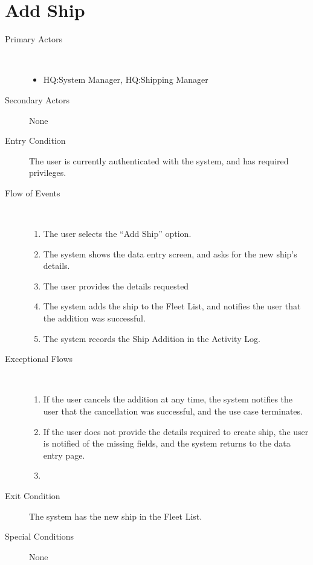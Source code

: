 \documentclass[a4paper,10pt]{report}
\begin{document}
\section{Add Ship}
\begin{description}
\item[Primary Actors] \
  \begin{itemize}
  \item HQ:System Manager, HQ:Shipping Manager
  \end{itemize}
\item[Secondary Actors] None
\item[Entry Condition]
  The user is currently authenticated with the system, and has required privileges.
\item[Flow of Events] \
  \begin{enumerate}
  \item The user selects the ``Add Ship'' option.
  \item The system shows the data entry screen, and asks for the new ship's details.
  \item The user provides the details requested
  \item The system adds the ship to the Fleet List, and notifies the user that the addition was successful.
    \item The system records the Ship Addition in the Activity Log.
  \end{enumerate}
\item[Exceptional Flows] \
  \begin{enumerate}
  \item If the user cancels the addition at any time, the system notifies the user that the cancellation was successful, and the use case terminates.
  \item If the user does not provide the details required to create ship, the user is notified of the missing fields, and the system returns to the data entry page.
  \item 
  \end{enumerate}
\item[Exit Condition]
  The system has the new ship in the Fleet List.
\item[Special Conditions] None
\end{description}
\end{document}
